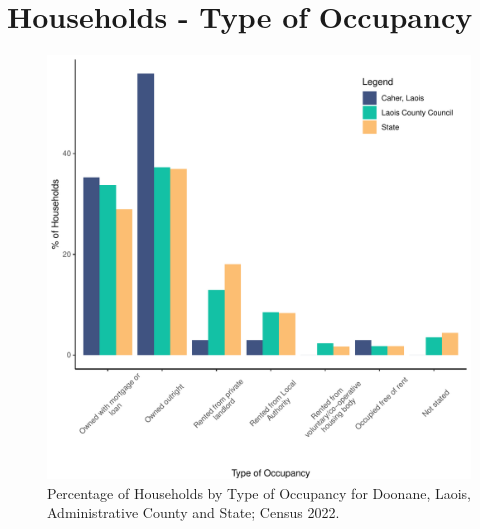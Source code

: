 \documentclass{article}
\begin{document}
\section{Households - Type of Occupancy}\label{sect:Households}
\begin{figure}[H]
	\centering
	\includegraphics[width = 140mm]{../figures/HouseholdsED.pdf}
	\caption{Percentage of Households by Type of Occupancy for Doonane, Laois, Administrative County and State; Census 2022.}
	\label{fig:vbnv}
	\end{figure}
\end{document}
